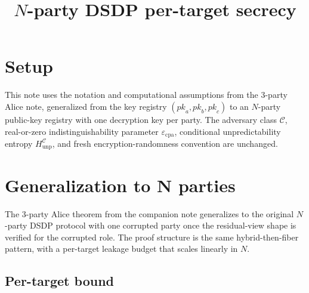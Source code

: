\documentclass[11pt]{article}
\title{$N$-party DSDP per-target secrecy}
\author{}
\date{}
\newcommand{\epscpa}{\varepsilon_{\mathrm{cpa}}}
\newcommand{\HunpC}{H_{\mathrm{unp}}^{\mathcal{C}}}
\newcommand{\C}{\mathcal{C}}
\newcommand{\pk}{\mathit{pk}}
\begin{document}
\maketitle

\section*{Setup}

This note uses the notation and computational assumptions from the 3-party Alice note, generalized from the key registry $(\pk_a, \pk_b, \pk_c)$ to an $N$-party public-key registry with one decryption key per party. The adversary class $\C$, real-or-zero indistinguishability parameter $\epscpa$, conditional unpredictability entropy $\HunpC$, and fresh encryption-randomness convention are unchanged.

\section*{Generalization to N parties}

The 3-party Alice theorem from the companion note generalizes to the original $N$-party DSDP protocol with one corrupted party once the residual-view shape is verified for the corrupted role. The proof structure is the same hybrid-then-fiber pattern, with a per-target leakage budget that scales linearly in $N$.

\subsection*{Per-target bound}
\end{document}
